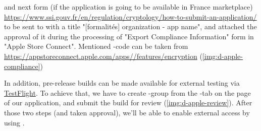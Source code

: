 \noindent and next form (if the application is going to be available in France marketplace) 
\href{https://www.ssi.gouv.fr/en/regulation/cryptology/how-to-submit-an-application/}{https://www.ssi.gouv.fr/en/regulation/cryptology/how-to-submit-an-application/}
to be sent to  with a title "[formalités] {organization} - {app name}", and attached the approval 
of it during the processing of "Export Compliance Information" form in "Apple Store Connect". Mentioned 
-code can be taken from 
\href{https://appstoreconnect.apple.com/apps}{https://appstoreconnect.apple.com/apps//features/encryption}
(\cref{img:d-apple-compliance})


In addition, pre-release builds can be made available for external testing via 
\href{https://testflight.apple.com/a}{TestFlight}. To achieve that, we have to create -group from 
the -tab on the page of our application, and submit the build for review (\cref{img:d-apple-review}).
After those two steps (and taken approval), we'll be able to enable external access by using .

